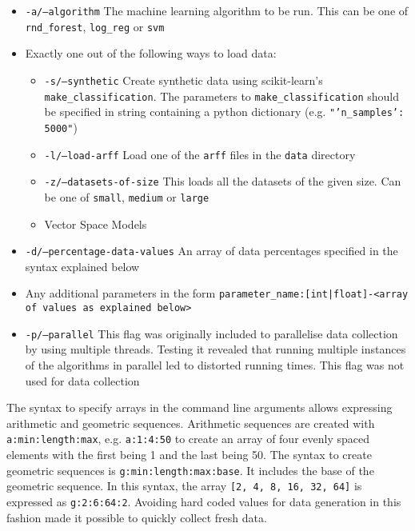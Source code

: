 \documentclass[a4paper,12pt,twoside,openright]{report}
\begin{document}
\begin{itemize}
\item \texttt{-a/--algorithm} The machine learning algorithm to be run. This can be one of \texttt{rnd\_forest}, \texttt{log\_reg} or \texttt{svm}
\item Exactly one out of the following ways to load data:
\begin{itemize}[label=$\star$]
        \item \texttt{-s/--synthetic} Create synthetic data using scikit-learn's \texttt{make\_classification}. The parameters to \texttt{make\_classification} should be specified in string containing a python dictionary (e.g. \texttt{"{'n\_samples': 5000}"})
        \item \texttt{-l/--load-arff} Load one of the \texttt{arff} files in the \texttt{data} directory
        \item \texttt{-z/--datasets-of-size} This loads all the datasets of the given size. Can be one of \texttt{small}, \texttt{medium} or \texttt{large}
        \item Vector Space Models
     \end{itemize}
\item \texttt{-d/--percentage-data-values} An array of data percentages specified in the syntax explained below
\item Any additional parameters in the form \texttt{parameter\_name:[int|float]-<array of values as explained below>}
\item \texttt{-p/--parallel} This flag was originally included to parallelise data collection by using multiple threads. Testing it revealed that running multiple instances of the algorithms in parallel led to distorted running times. This flag was not used for data collection
\end{itemize}

The syntax to specify arrays in the command line arguments allows expressing arithmetic and geometric sequences. Arithmetic sequences are created with \texttt{a:min:length:max}, e.g. \texttt{a:1:4:50} to create an array of four evenly spaced elements with the first being 1 and the last being 50. The syntax to create geometric sequences is \texttt{g:min:length:max:base}. It includes the base of the geometric sequence. In this syntax, the array \texttt{[2, 4, 8, 16, 32, 64]} is expressed as \texttt{g:2:6:64:2}. Avoiding hard coded values for data generation in this fashion made it possible to quickly collect fresh data.
	
\end{document}
